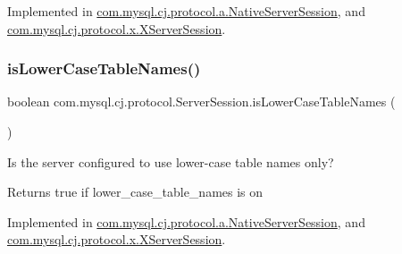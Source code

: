 Implemented in \mbox{\hyperlink{classcom_1_1mysql_1_1cj_1_1protocol_1_1a_1_1_native_server_session_adade829bf44ed55a8ac1a93ae5716a4b}{com.\+mysql.\+cj.\+protocol.\+a.\+Native\+Server\+Session}}, and \mbox{\hyperlink{classcom_1_1mysql_1_1cj_1_1protocol_1_1x_1_1_x_server_session_a1068b24a38e39b920df3a43fbf48b14c}{com.\+mysql.\+cj.\+protocol.\+x.\+X\+Server\+Session}}.

\mbox{\label{interfacecom_1_1mysql_1_1cj_1_1protocol_1_1_server_session_a48d31222ed61fa5971aae698a5ff9fdf}} 
\subsubsection{\texorpdfstring{is\+Lower\+Case\+Table\+Names()}{isLowerCaseTableNames()}}
{\footnotesize\ttfamily boolean com.\+mysql.\+cj.\+protocol.\+Server\+Session.\+is\+Lower\+Case\+Table\+Names (\begin{DoxyParamCaption}{ }\end{DoxyParamCaption})}

Is the server configured to use lower-\/case table names only?

\begin{DoxyReturn}{Returns}
true if lower\+\_\+case\+\_\+table\+\_\+names is \textquotesingle{}on\textquotesingle{} 
\end{DoxyReturn}


Implemented in \mbox{\hyperlink{classcom_1_1mysql_1_1cj_1_1protocol_1_1a_1_1_native_server_session_a4409c3413cfab0fe0ce91af5d4c05454}{com.\+mysql.\+cj.\+protocol.\+a.\+Native\+Server\+Session}}, and \mbox{\hyperlink{classcom_1_1mysql_1_1cj_1_1protocol_1_1x_1_1_x_server_session_a835d6363081496694ef7760c4fe555c8}{com.\+mysql.\+cj.\+protocol.\+x.\+X\+Server\+Session}}.

\mbox{\label{interfacecom_1_1mysql_1_1cj_1_1protocol_1_1_server_session_a0ce8df759d76a4478164af19d85b837b}} 
